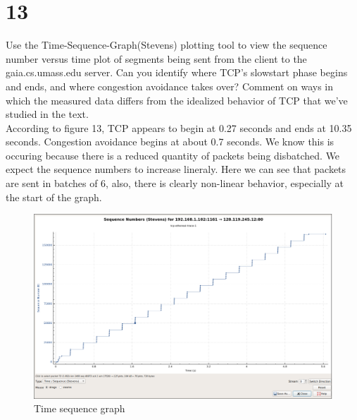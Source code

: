 \documentclass{article}
\begin{document}
\section*{13}
Use the Time-Sequence-Graph(Stevens) plotting tool to view the sequence
number versus time plot of segments being sent from the client to the
gaia.cs.umass.edu server. Can you identify where TCP’s slowstart phase begins
and ends, and where congestion avoidance takes over? Comment on ways in
which the measured data differs from the idealized behavior of TCP that we’ve
studied in the text.\\
\newline According to figure 13, TCP appears to begin at 0.27 seconds and ends at 10.35 seconds.  Congestion avoidance begins at about 0.7 seconds.  We know this is occuring because there is a reduced quantity of packets being disbatched.  We expect the sequence numbers to increase lineraly.  Here we can see that packets are sent in batches of 6, also, there is clearly non-linear behavior, especially at the start of the graph.\\
\begin{figure}[h!]
\centering
\includegraphics[scale=0.4]{Q13REAL.png}
\caption{Time sequence graph}
\end{figure}
\clearpage
\end{document}
